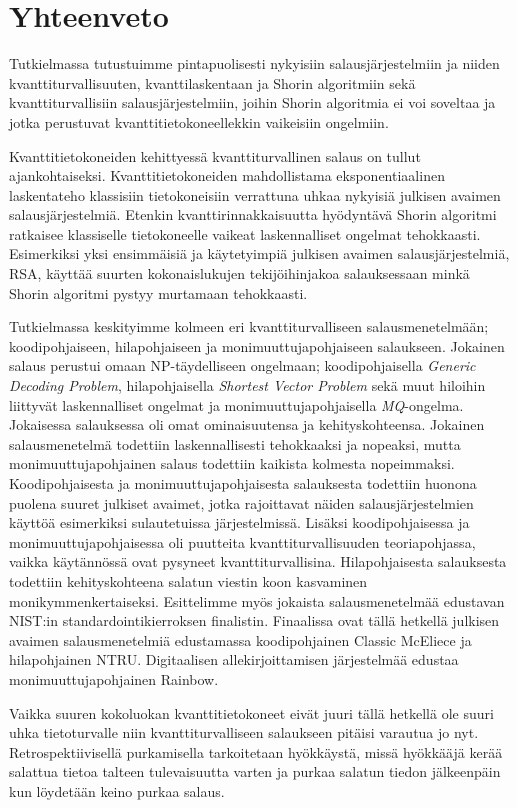 \chapter{Yhteenveto\label{conclusions}}

Tutkielmassa tutustuimme pintapuolisesti nykyisiin salausjärjestelmiin ja niiden kvanttiturvallisuuten, kvanttilaskentaan ja Shorin algoritmiin sekä kvanttiturvallisiin salausjärjestelmiin, joihin Shorin algoritmia ei voi soveltaa ja jotka perustuvat kvanttitietokoneellekkin vaikeisiin ongelmiin.

Kvanttitietokoneiden kehittyessä kvanttiturvallinen salaus on tullut ajankohtaiseksi. Kvanttitietokoneiden mahdollistama eksponentiaalinen laskentateho klassisiin tietokoneisiin verrattuna uhkaa nykyisiä julkisen avaimen salausjärjestelmiä. Etenkin kvanttirinnakkaisuutta hyödyntävä Shorin algoritmi ratkaisee klassiselle tietokoneelle vaikeat laskennalliset ongelmat tehokkaasti. Esimerkiksi yksi ensimmäisiä ja käytetyimpiä julkisen avaimen salausjärjestelmiä, RSA, käyttää suurten kokonaislukujen tekijöihinjakoa salauksessaan minkä Shorin algoritmi pystyy murtamaan tehokkaasti.

Tutkielmassa keskityimme kolmeen eri kvanttiturvalliseen salausmenetelmään; koodipohjaiseen, hilapohjaiseen ja monimuuttujapohjaiseen salaukseen. Jokainen salaus perustui omaan NP-täydelliseen ongelmaan; koodipohjaisella  \emph{Generic Decoding Problem}, hilapohjaisella \emph{Shortest Vector Problem} sekä muut hiloihin liittyvät laskennalliset ongelmat ja monimuuttujapohjaisella \emph{MQ}-ongelma. Jokaisessa salauksessa oli omat ominaisuutensa ja kehityskohteensa. Jokainen salausmenetelmä todettiin laskennallisesti tehokkaaksi ja nopeaksi, mutta monimuuttujapohjainen salaus todettiin kaikista kolmesta nopeimmaksi. Koodipohjaisesta ja monimuuttujapohjaisesta salauksesta todettiin huonona puolena suuret julkiset avaimet, jotka rajoittavat näiden salausjärjestelmien käyttöä esimerkiksi sulautetuissa järjestelmissä. Lisäksi koodipohjaisessa ja monimuuttujapohjaisessa oli puutteita kvanttiturvallisuuden teoriapohjassa, vaikka käytännössä ovat pysyneet kvanttiturvallisina. Hilapohjaisesta salauksesta todettiin kehityskohteena salatun viestin koon kasvaminen monikymmenkertaiseksi. Esittelimme myös jokaista salausmenetelmää edustavan NIST:in standardointikierroksen finalistin. Finaalissa ovat tällä hetkellä julkisen avaimen salausmenetelmiä edustamassa koodipohjainen Classic McEliece ja hilapohjainen NTRU. Digitaalisen allekirjoittamisen järjestelmää edustaa monimuuttujapohjainen Rainbow.

Vaikka suuren kokoluokan kvanttitietokoneet eivät juuri tällä hetkellä ole suuri uhka tietoturvalle niin kvanttiturvalliseen salaukseen pitäisi varautua jo nyt. Retrospektiivisellä purkamisella tarkoitetaan hyökkäystä, missä hyökkääjä kerää salattua tietoa talteen tulevaisuutta varten ja purkaa salatun tiedon jälkeenpäin kun löydetään keino purkaa salaus.